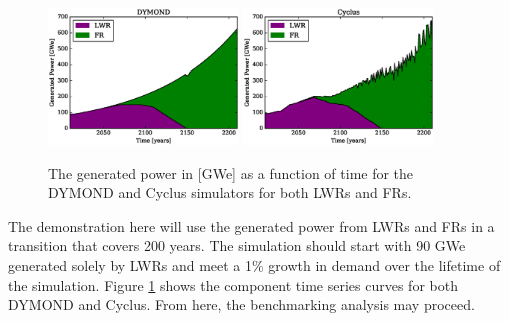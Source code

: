 \begin{figure}[htb]
\centering
\includegraphics[width=0.45\textwidth]{gwe-dymond.eps}
\includegraphics[width=0.45\textwidth]{gwe-cyclus.eps}
\caption{The generated power in [GWe] as a function of time for the DYMOND and 
Cyclus simulators for both LWRs and FRs.}
\label{gwe-simulators}
\end{figure}

The demonstration here will use the generated power from LWRs and FRs in 
a transition that covers 200 years. The simulation should start with
90 GWe generated solely by LWRs and meet a 1\% growth in demand over the 
lifetime of the simulation. Figure \ref{gwe-simulators} shows the component time 
series curves for both DYMOND and Cyclus.  From here, the benchmarking 
analysis may proceed.

\clearpage

